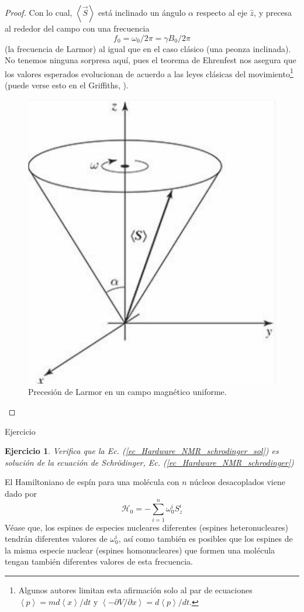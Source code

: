 \documentclass[a4paper,11pt]{book} %
\newtheorem{ejercicio_contador}{Ejercicio}
\newcommand{\Ejercicio}[1]{
		\begin{mybox_gray}{Ejercicio} 
			\begin{ejercicio_contador}
				 #1 
			\end{ejercicio_contador} 
		\end{mybox_gray}
	}
\numberwithin{equation}{chapter}
\begin{document}
\begin{proof}
Con lo cual, $\left\langle \vec{S} \right\rangle$ está inclinado un ángulo $\alpha$ respecto al eje $\hat{z}$, y precesa al rededor del campo con una frecuencia 
	\begin{equation}
	f_0 = \omega_0 / 2 \pi = \gamma B_0 / 2 \pi
	\end{equation}
(la frecuencia de Larmor) al igual que en el caso clásico (una peonza inclinada). No tenemos ninguna sorpresa aquí, pues el teorema de Ehrenfest nos asegura que los valores esperados evolucionan de acuerdo a las leyes clásicas del movimiento\footnote{Algunos autores limitan esta afirmación solo al par de ecuaciones $\left\langle p \right\rangle = m d \left\langle x \right\rangle / dt$ y $\left\langle - \partial V / \partial x \right\rangle = d \left\langle p \right\rangle / dt$.} (puede verse esto en el Griffiths, \cite{bib_griffiths_schroeter_2018}). 
	\begin{figure}[H]
	\centering 
	\includegraphics[width=0.30\linewidth]{Figuras/Fig_Harware_NMR_precession_griffiths}
	\caption{Precesión de Larmor en un campo magnético uniforme.}
	\label{Fig_Harware_NMR_precession_griffiths}
	\end{figure}

\end{proof}


	\Ejercicio{
	Verifica que la Ec. (\ref{ec_Hardware_NMR_schrodinger_sol}) es solución de la ecuación de Schrödinger, Ec. (\ref{ec_Hardware_NMR_schrodinger})
	}

El Hamiltoniano de espín para una molécula con $n$ núcleos desacoplados viene dado por 
	\begin{equation} \label{ec_Hardware_NMR_H_single}
	\mathcal{H}_0 = - \sum_{i=1}^n  \omega_0^i S_z^i
	\end{equation}
Véase que, los espines de especies nucleares diferentes (espines heteronucleares) tendrán diferentes valores de $\omega_0^i$, así como también es posibles que los espines de la misma especie nuclear (espines homonucleares) que formen una molécula  tengan también diferentes valores de esta frecuencia.
\end{document}
